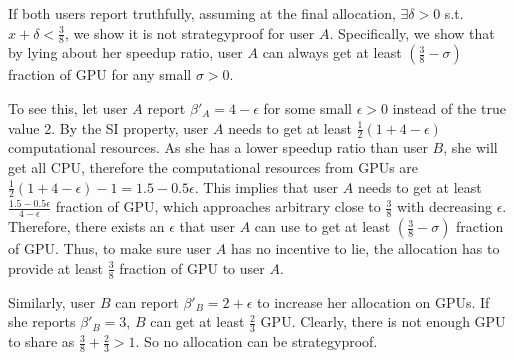 If both users report truthfully, assuming at the final allocation, $\exists \delta>0$ s.t. $x+\delta < \frac{3}{8}$, we show it is not strategyproof for user $A$. Specifically, we show that by lying about her speedup ratio, user $A$ can always get at least $(\frac{3}{8}-\sigma)$ fraction of GPU for any small $\sigma > 0$.

To see this, let user $A$ report $\beta'_A = 4- \epsilon$ for some small $\epsilon>0$ instead of the true value $2$. By the SI property, user $A$ needs to get at least $\frac{1}{2}(1+4-\epsilon)$ computational resources. As she has a lower speedup ratio than user $B$, she will get all CPU, therefore the computational resources from GPUs are $\frac{1}{2}(1+4-\epsilon)-1 = 1.5-0.5\epsilon$. This implies that user $A$ needs to get at least $\frac{1.5-0.5\epsilon}{4-\epsilon}$ fraction of GPU, which approaches arbitrary close to $\frac{3}{8}$ with decreasing $\epsilon$. Therefore, there exists an $\epsilon$ that user $A$ can use to get at least $(\frac{3}{8}-\sigma)$ fraction of GPU. 
Thus, to make sure user $A$ has no incentive to lie, the allocation has to provide at least $\frac{3}{8}$ fraction of GPU to user $A$. 

Similarly, user $B$ can report $\beta'_B=2+\epsilon$ to increase her allocation on GPUs. If she reports $\beta'_B=3$, $B$ can get at least $\frac{2}{3}$ GPU. Clearly, there is not enough GPU to share as $\frac{3}{8} + \frac{2}{3} > 1$. So no allocation can be strategyproof.



	



